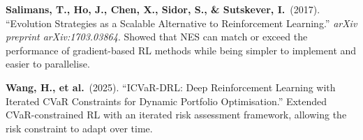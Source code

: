 \documentclass[11pt, a4paper]{article}
\theoremstyle{definition}
\theoremstyle{plain}
\theoremstyle{remark}
\begin{document}
\begin{enumerate}[leftmargin=2em, label={[\arabic*]}]
    \item \textbf{Salimans, T., Ho, J., Chen, X., Sidor, S., \&
          Sutskever, I.}~(2017).
          ``Evolution Strategies as a Scalable Alternative to Reinforcement
          Learning.''
          \emph{arXiv preprint arXiv:1703.03864}.
          Showed that NES can match or exceed the performance of
          gradient-based RL methods while being simpler to implement and
          easier to parallelise.

    \item \textbf{Wang, H., et al.}~(2025).
          ``ICVaR-DRL: Deep Reinforcement Learning with Iterated CVaR
          Constraints for Dynamic Portfolio Optimisation.''
          Extended CVaR-constrained RL with an iterated risk assessment
          framework, allowing the risk constraint to adapt over time.

\end{enumerate}
\end{document}
